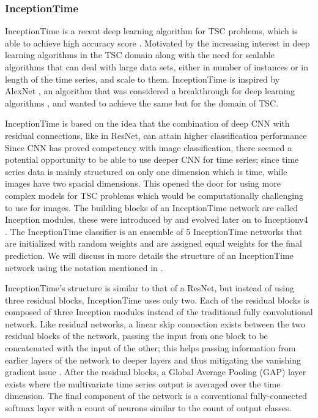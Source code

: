 \subsubsection{InceptionTime}
\label{SubsubsectionInception}
InceptionTime \cite{fawaz2020inceptiontime} is a recent deep learning algorithm for TSC problems, which is able to achieve high accuracy score \cite{ruiz2020great}.
Motivated by the increasing interest in deep learning algorithms in the TSC domain along with the need for scalable algorithms
that can deal with large data sets, either in number of instances or in length of the time series, and scale to them.
InceptionTime is inspired by AlexNet \cite{krizhevsky2012imagenet}, an algorithm that was considered a breakthrough for deep learning algorithms \cite{alom2018history},
and wanted to achieve the same but for the domain of TSC.

InceptionTime is based on the idea that the combination of deep CNN with residual connections, like in ResNet, can attain higher classification performance \cite{fawaz2019deepreview}
Since CNN has proved competency with image classification, there seemed a potential opportunity to be able to use deeper CNN for time series;
since time series data is mainly structured on only one dimension which is time, while images have two spacial dimensions.
This opened the door for using more complex models for TSC problems which would be computationally challenging to use for images.
The building blocks of an InceptionTime network are called Inception modules, these were introduced by \cite{szegedy2015going} and evolved later on to Inceptionv4 \cite{szegedy2017inception}.
The InceptionTime classifier is an ensemble of 5 InceptionTime networks that are initialized with random weights and are assigned equal weights for the final prediction.
We will discuss in more details the structure of an InceptionTime network using the notation mentioned in \cite{fawaz2020inceptiontime}.

InceptionTime's structure is similar to that of a ResNet, but instead of using three residual blocks, InceptionTime uses only two.
Each of the residual blocks is composed of three Inception modules instead of the traditional fully convolutional network.
Like residual networks, a linear skip connection exists between the two residual blocks of the network, passing the input from one block to be concatenated with the input of the other;
this helps passing information from earlier layers of the network to deeper layers and thus mitigating the vanishing gradient issue \cite{he2016deep}.
After the residual blocks, a Global Average Pooling (GAP) layer exists where the multivariate time series output is averaged over the time dimension.
The final component of the network is a conventional fully-connected softmax layer with a count of neurons similar to the count of output classes.


